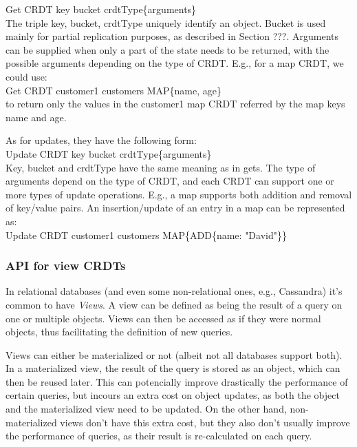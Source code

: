 \documentclass{vldb}
\begin{document}
Get CRDT key bucket crdtType\{arguments\} \\ 

The triple key, bucket, crdtType uniquely identify an object. 
Bucket is used mainly for partial replication purposes, as described in Section ???. %
Arguments can be supplied when only a part of the state needs to be returned, with the possible arguments depending on the type of CRDT. E.g., for a map CRDT, we could use: \\

Get CRDT customer1 customers MAP\{name, age\}\\

to return only the values in the customer1 map CRDT referred by the map keys name and age.

As for updates, they have the following form: \\

Update CRDT key bucket crdtType\{arguments\} \\

Key, bucket and crdtType have the same meaning as in gets.
The type of arguments depend on the type of CRDT, and each CRDT can support one or more types of update operations. 
E.g., a map supports both addition and removal of key/value pairs.
An insertion/update of an entry in a map can be represented as: \\

Update CRDT customer1 customers MAP\{ADD\{name: "David"\}\} \\

\subsubsection{API for view CRDTs}
\label{subsubsec:APIView}

In relational databases (and even some non-relational ones, e.g., Cassandra) it's common to have \emph{Views}. 
A view can be defined as being the result of a query on one or multiple objects.
Views can then be accessed as if they were normal objects, thus facilitating the definition of new queries.

Views can either be materialized or not (albeit not all databases support both). %
In a materialized view, the result of the query is stored as an object, which can then be reused later.
This can potencially improve drastically the performance of certain queries, but incours an extra cost on object updates, as both the object and the materialized view need to be updated.
On the other hand, non-materialized views don't have this extra cost, but they also don't usually improve the performance of queries, as their result is re-calculated on each query.
\end{document}
